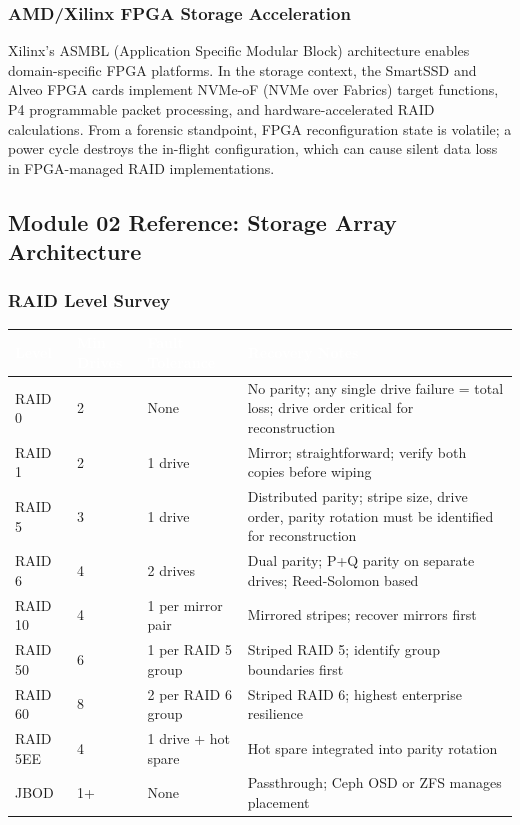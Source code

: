\documentclass[11pt,letterpaper]{article}
\newcommand{\tableheader}[1]{\textbf{\sffamily\textcolor{white}{#1}}}
\begin{document}
\subsubsection{AMD/Xilinx FPGA Storage Acceleration}

Xilinx's ASMBL (Application Specific Modular Block) architecture enables domain-specific FPGA platforms. In the storage context, the SmartSSD and Alveo FPGA cards implement NVMe-oF (NVMe over Fabrics) target functions, P4 programmable packet processing, and hardware-accelerated RAID calculations. From a forensic standpoint, FPGA reconfiguration state is volatile; a power cycle destroys the in-flight configuration, which can cause silent data loss in FPGA-managed RAID implementations.

\subsection{Module 02 Reference: Storage Array Architecture}

\subsubsection{RAID Level Survey}

\begin{center}
\begin{tabularx}{\textwidth}{L{2cm}L{2.5cm}L{2.5cm}X}
\toprule
{}
\tableheader{Level} & \tableheader{Min Drives} & \tableheader{Fault Tolerance} & \tableheader{Recovery Notes} \\
\midrule
RAID 0 & 2 & None & No parity; any single drive failure = total loss; drive order critical for reconstruction \\
RAID 1 & 2 & 1 drive & Mirror; straightforward; verify both copies before wiping \\
RAID 5 & 3 & 1 drive & Distributed parity; stripe size, drive order, parity rotation must be identified for reconstruction \\
RAID 6 & 4 & 2 drives & Dual parity; P+Q parity on separate drives; Reed-Solomon based \\
RAID 10 & 4 & 1 per mirror pair & Mirrored stripes; recover mirrors first \\
RAID 50 & 6 & 1 per RAID 5 group & Striped RAID 5; identify group boundaries first \\
RAID 60 & 8 & 2 per RAID 6 group & Striped RAID 6; highest enterprise resilience \\
RAID 5EE & 4 & 1 drive + hot spare & Hot spare integrated into parity rotation \\
JBOD & 1+ & None & Passthrough; Ceph OSD or ZFS manages placement \\
\bottomrule
\end{tabularx}
\end{center}
\end{document}

